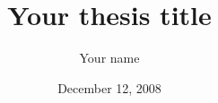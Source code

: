 \documentclass[12pt,oneside]{amsbook}
\numberwithin{equation}{chapter}
\numberwithin{figure}{chapter}
\theoremstyle{plain} %
\theoremstyle{definition}
\theoremstyle{remark}
\begin{document}
\frontmatter %
\title[]{Your thesis title }
\author{Your name}
\address{Department of Physics and Astronomy \\Bates College\\Lewiston, ME 04240}
\date{December 12, 2008}
\maketitle

\thispagestyle{empty} 			%
\setcounter{page}{2}

\tableofcontents




\mainmatter %



\backmatter

\end{document}
